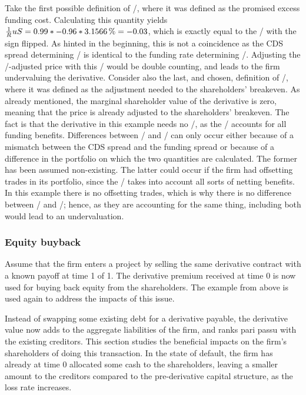\documentclass[../main.tex]{subfiles}
\begin{document}
            Take the first possible definition of \FVA/, 
            where it was defined as the promised excess funding cost.
            Calculating this quantity yields 
            $\discountfactor u S = \num{0.99} * \num{-0.96} * \pct{0.031566} = \num{-0.03}$,
            which is exactly equal to the \DVA/ with the sign flipped.
            As hinted in the beginning, 
            this is not a coincidence as the CDS spread determining \DVA/
            is identical to the funding rate determining \FVA/.
            Adjusting the \DVA/-adjusted price with this \FVA/ would be double counting,
            and leads to the firm undervaluing the derivative.
            Consider also the last, and chosen, definition of \FVA/,
            where it was defined as the adjustment needed to the shareholders' breakeven.
            As already mentioned, the marginal shareholder value of the derivative is zero,
            meaning that the price is already adjusted to the shareholders' breakeven.
            The fact is that the derivative in this example needs no \FVA/,
            as the \DVA/ accounts for all funding benefits.
            Differences between \DVA/ and \FBA/ can only occur either because of a
            mismatch between the CDS spread and the funding spread
            or because of a difference in the portfolio on which the two quantities are calculated. 
            The former has been assumed non-existing.
            The latter could occur if the firm had offsetting trades in its portfolio,
            since the \FVA/ takes into account all sorts of netting benefits.
            In this example there is no offsetting trades, 
            which is why there is no difference between \DVA/ and \FBA/;
            hence, as they are accounting for the same thing, 
            including both would lead to an undervaluation.

        \subsubsection{Equity buyback}
            Assume that the firm enters a project 
            by selling the same derivative contract with a known payoff at time 1 of 1. 
            The derivative premium received at time 0 is now used for buying back equity from the shareholders. 
            The example from above is used again to address the impacts of this issue.

            Instead of swapping some existing debt for a derivative payable, 
            the derivative value now adds to the aggregate liabilities of the firm, 
            and ranks pari passu with the existing creditors.
            This section studies the beneficial impacts on the firm's shareholders of doing this transaction.
            In the state of default, the firm has already at time 0 allocated some cash to the shareholders, 
            leaving a smaller amount to the creditors compared to the pre-derivative capital structure, 
            as the loss rate increases.
\end{document}
